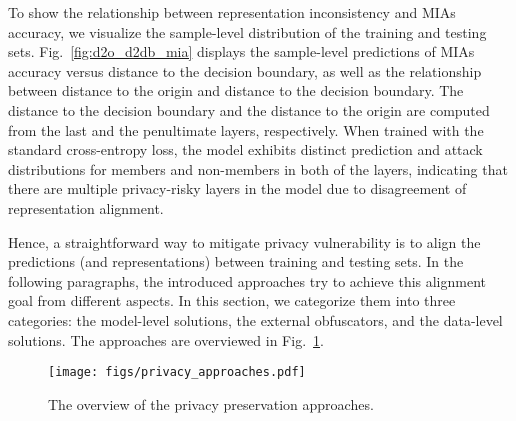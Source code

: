 To show the relationship between representation inconsistency and MIAs accuracy, we visualize the sample-level distribution of the training and testing sets. Fig.~\ref{fig:d2o_d2db_mia} displays the sample-level predictions of MIAs accuracy versus distance to the decision boundary, as well as the relationship between distance to the origin and distance to the decision boundary. The distance to the decision boundary and the distance to the origin are computed from the last and the penultimate layers, respectively. When trained with the standard cross-entropy loss, the model exhibits distinct prediction and attack distributions for members and non-members in both of the layers, indicating that there are multiple privacy-risky layers in the model due to disagreement of representation alignment.


Hence, a straightforward way to mitigate privacy vulnerability is to align the predictions (and representations) between training and testing sets. In the following paragraphs, the introduced approaches try to achieve this alignment goal from different aspects.
In this section, we categorize them into three categories: the model-level solutions, the external obfuscators, and the data-level solutions. The approaches are overviewed in Fig.~\ref{fig:overview_privacy_defence}.


\begin{figure}[t]
     \centering
         \texttt{[image: figs/privacy\_approaches.pdf]}
         \vspace{-0.1cm}
      \caption{The overview of the privacy preservation approaches.}
      \vspace{-0.2cm}
  \label{fig:overview_privacy_defence}
\end{figure}


